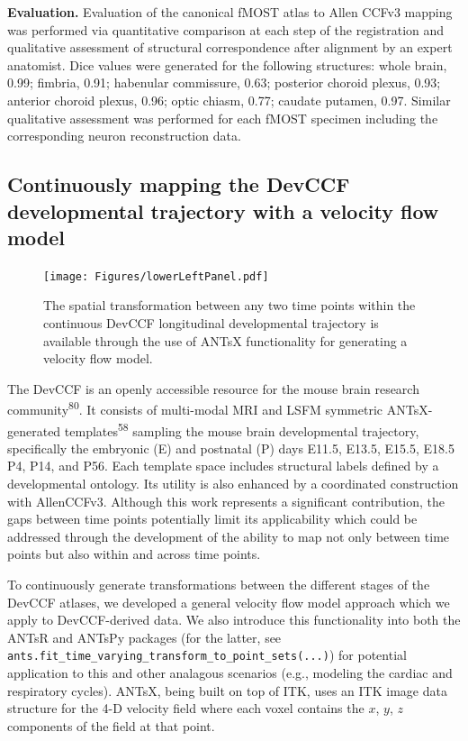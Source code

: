 \documentclass[
  12pt,
]{article}
\begin{document}
\textbf{Evaluation.} Evaluation of the canonical fMOST atlas to Allen
CCFv3 mapping was performed via quantitative comparison at each step of
the registration and qualitative assessment of structural correspondence
after alignment by an expert anatomist. Dice values were generated for
the following structures: whole brain, 0.99; fimbria, 0.91; habenular
commissure, 0.63; posterior choroid plexus, 0.93; anterior choroid
plexus, 0.96; optic chiasm, 0.77; caudate putamen, 0.97. Similar
qualitative assessment was performed for each fMOST specimen including
the corresponding neuron reconstruction data.

\subsection{Continuously mapping the DevCCF developmental trajectory
with a velocity flow
model}\label{continuously-mapping-the-devccf-developmental-trajectory-with-a-velocity-flow-model}

\begin{figure}
\centering
\texttt{[image: Figures/lowerLeftPanel.pdf]}
\caption{The spatial transformation between any two time points within the
continuous DevCCF longitudinal developmental trajectory is available through the
use of ANTsX functionality for generating a velocity flow model.}
\label{fig:devccfvelocity}
\end{figure}

The DevCCF is an openly accessible resource for the mouse brain research
community\textsuperscript{80}. It consists of multi-modal MRI and LSFM
symmetric ANTsX-generated templates\textsuperscript{58} sampling the
mouse brain developmental trajectory, specifically the embryonic (E) and
postnatal (P) days E11.5, E13.5, E15.5, E18.5 P4, P14, and P56. Each
template space includes structural labels defined by a developmental
ontology. Its utility is also enhanced by a coordinated construction
with AllenCCFv3. Although this work represents a significant
contribution, the gaps between time points potentially limit its
applicability which could be addressed through the development of the
ability to map not only between time points but also within and across
time points.

To continuously generate transformations between the different stages of
the DevCCF atlases, we developed a general velocity flow model approach
which we apply to DevCCF-derived data. We also introduce this
functionality into both the ANTsR and ANTsPy packages (for the latter,
see \texttt{ants.fit\_time\_varying\_transform\_to\_point\_sets(...)})
for potential application to this and other analagous scenarios (e.g.,
modeling the cardiac and respiratory cycles). ANTsX, being built on top
of ITK, uses an ITK image data structure for the 4-D velocity field
where each voxel contains the \(x\), \(y\), \(z\) components of the
field at that point.
\end{document}
